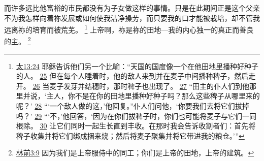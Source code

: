 \documentclass[12pt, a4paper, oneside]{ctexart}
\begin{document}
    而许多远比他富裕的市民都没有为子女做这样的事情。只是在此期间正是这个父亲不为我怎样向着祢发展或如何使我洁净操劳，而只要我的口才能被栽培，却不管我远离祢的培育而被荒芜。
    \footnote {
        \href{https://biblehub.com/matthew/13-24.htm}{太13:24} 耶稣告诉他们另一个比喻：“天国的国度像一个在他田地里播种好种子的人。
        \href{https://biblehub.com/matthew/13-25.htm}{25} 但在每个人睡着时，他的敌人来到并在麦子中间播种稗子，然后走开。
        \href{https://biblehub.com/matthew/13-26.htm}{26} 当麦子发芽并结穗时，那时稗子也出现了。
        \href{https://biblehub.com/matthew/13-27.htm}{27} “田主的仆人们到他那里并说，‘主人，你不是在你的田地里播种好种子吗？那么这些稗子从哪里来的呢？’
        \href{https://biblehub.com/matthew/13-28.htm}{28} “‘一个敌人做的这，’他回复。”仆人们问他，‘你要我们去将它们拔掉吗？’
        \href{https://biblehub.com/matthew/13-29.htm}{29} “‘不，’他回答，‘因为在你们拔稗子时，你们也可能将麦子与它们一同根除。
        \href{https://biblehub.com/matthew/13-30.htm}{30} 让它们同时一起生长直到丰收。在那时我会告诉收割者们：首先将稗子收集并将它们绑成捆来烧；然后将麦子聚集并将它带进我的粮仓。’”
    }
    上帝啊，祢是祢的田地---我的内心独一的真正而善良的主。
    \footnote {
        \href{https://biblehub.com/1_corinthians/3-9.htm}{林前3:9} 因为我们是上帝服侍中的同工；你们是上帝的田地，上帝的建筑。
    }
\end{document}
